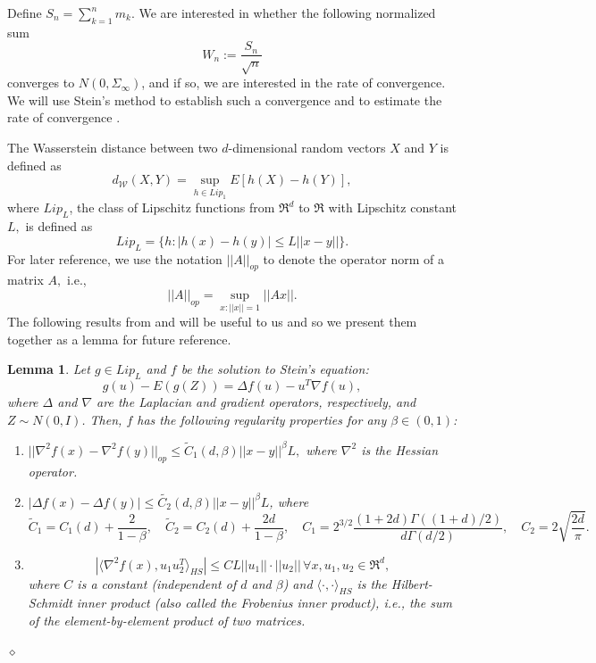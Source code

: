 \documentclass[10pt,a4paper]{article}
\newtheorem{lemma}{Lemma}
\begin{document}
Define
$S_n=\sum_{k=1}^n m_k.$ We are interested in whether the following normalized sum 
\begin{equation}\label{eq: normalized sum}
W_n:=\frac{S_n}{\sqrt{n}}
\end{equation}
converges to $N(0,\Sigma_\infty)$, and if so, we are interested in the rate of convergence. We will use Stein's method to establish such a convergence and to estimate the rate of convergence \citep{stein1972bound,ross2011fundamentals,chatterjee2014short}. 

The Wasserstein distance between two $d$-dimensional random vectors $X$ and $Y$ is defined as
$$d_{\mathcal{W}}(X,Y)=\sup_{h\in Lip_1} E[h(X)-h(Y)],$$
where $Lip_L$, the class of Lipschitz functions from $\Re^d$ to $\Re$  with Lipschitz constant $L,$ is defined as
$$Lip_L=\{h: |h(x)-h(y)|\leq L||x-y||\}.$$
For later reference, we use the notation $||A||_{op}$  to denote the operator norm of a matrix $A,$ i.e., $$||A||_{op}=\sup_{x: ||x||=1}||Ax||.$$
The following results from \cite[Propositions 2.2 and 2.3]{gallouet2018regularity} and \cite[Theorem 3.1]{fang2019multivariate} will be useful to us and so we present them together as a lemma for future reference.
\begin{lemma}\label{lem: regularity}
Let $g\in Lip_L$ and $f$ be the solution to Stein's equation:
\begin{equation}\label{eq: Stein}
    g(u)-E(g(Z))=\Delta f(u)-u^T\nabla f(u),
\end{equation}
where $\Delta$ and $\nabla$ are the Laplacian and gradient operators, respectively, and $Z\sim N(0,I)$. Then, $f$ has the following regularity properties for any $\beta\in (0,1)$:
\begin{enumerate}
    \item $||\nabla^2f(x)-\nabla^2f(y)||_{op}\leq \tilde{C}_1(d,\beta)||x-y||^\beta L,$ where $\nabla^2$ is the Hessian operator.
    \item $|\Delta f(x)-\Delta f(y)|\leq \tilde{C_2}(d,\beta)||x-y||^\beta L$,
where  $$\tilde{C}_1=C_1(d)+\frac{2}{1-\beta}, \quad \tilde{C}_2=C_2(d)+\frac{2d}{1-\beta}, \quad 
C_1=2^{3/2}\frac{(1+2d)\Gamma((1+d)/2)}{d\Gamma(d/2)},\quad C_2=2\sqrt{\frac{2d}{\pi}}.$$
    \item  $$\left|\langle\nabla^2 f(x),u_1u_2^T\rangle_{HS}\right|\leq C L||u_1||\cdot||u_2||\,\forall x, u_1, u_2\in \Re^d,$$ where $C$ is a constant (independent of $d$ and $\beta$) and $\langle\cdot,\cdot\rangle_{HS}$ is the Hilbert-Schmidt inner product (also called the Frobenius inner product), i.e., the sum of the element-by-element product of two matrices.
\end{enumerate}
\hfill $\diamond$
\end{lemma}
\end{document}
